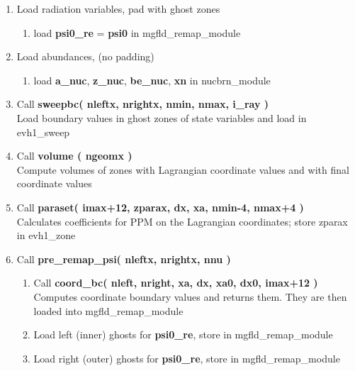 \documentclass[11pt,doublespace]{article}
\begin{document}
\begin{itemize}
\begin{enumerate}
\begin{enumerate}
  \item Load radiation variables, pad with ghost zones

\begin{enumerate}

  \item load {\bf psi0\_re} = {\bf psi0} in mgfld\_remap\_module

\end{enumerate}

  \item Load abundances, (no padding)

\begin{enumerate}

  \item load {\bf a\_nuc}, {\bf z\_nuc}, {\bf be\_nuc}, {\bf xn} in nucbrn\_module

\end{enumerate}

  \item Call {\bf sweepbc( nleftx, nrightx, nmin, nmax, i\_ray )}\\
  Load boundary values in ghost zones of state variables and load in evh1\_sweep

  \item Call {\bf volume ( ngeomx )}\\
  Compute volumes of zones with Lagrangian coordinate values and with final coordinate values

  \item Call {\bf paraset( imax+12, zparax, dx, xa, nmin-4, nmax+4 )}\\
  Calculates coefficients for PPM on the Lagrangian coordinates; store zparax in evh1\_zone

  \item Call {\bf pre\_remap\_psi( nleftx, nrightx, nnu )}

\begin{enumerate}

  \item Call {\bf coord\_bc( nleft, nright, xa, dx, xa0, dx0, imax+12 )}\\
  Computes coordinate boundary values and returns them. They are then loaded into mgfld\_remap\_module

  \item Load left (inner) ghosts for {\bf psi0\_re}, store in mgfld\_remap\_module

  \item Load right (outer) ghosts for {\bf psi0\_re}, store in mgfld\_remap\_module


\end{enumerate}
\end{enumerate}
\end{enumerate}
\end{itemize}
\end{document}

